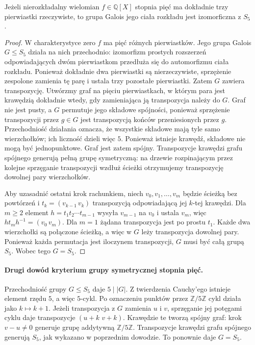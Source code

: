 \begin{lemat}
\label{aa:lem:s5-criterion}
Jeżeli nierozkładalny wielomian $f\in\mathbb Q[X]$
stopnia pięć ma dokładnie trzy pierwiastki rzeczywiste,
to grupa Galois jego ciała rozkładu jest izomorficzna z $S_5$.
\end{lemat}
\begin{proof}
W charakterystyce zero $f$ ma pięć różnych pierwiastków.
Jego grupa Galois $G\le S_5$ działa na nich przechodnio:
izomorfizm prostych rozszerzeń odpowiadających dwóm
pierwiastkom przedłuża się do automorfizmu ciała rozkładu.
Ponieważ dokładnie dwa pierwiastki są nierzeczywiste,
sprzężenie zespolone zamienia tę parę i ustala trzy
pozostałe pierwiastki. Zatem $G$ zawiera transpozycję.
Utwórzmy graf na pięciu pierwiastkach, w którym
para jest krawędzią dokładnie wtedy, gdy zamieniająca
ją transpozycja należy do $G$.
Graf nie jest pusty, a $G$ permutuje jego składowe spójności,
ponieważ sprzężenie transpozycji przez $g\in G$
jest transpozycją końców przeniesionych przez $g$.
Przechodniość działania oznacza, że wszystkie składowe
mają tyle samo wierzchołków; ich liczność dzieli więc $5$.
Ponieważ istnieje krawędź, składowe nie mogą być jednopunktowe.
Graf jest zatem spójny. Transpozycje krawędzi grafu spójnego
generują pełną grupę symetryczną: na drzewie rozpinającym
przez kolejne sprzęganie transpozycji wzdłuż ścieżki
otrzymujemy transpozycję dowolnej pary wierzchołków.

Aby uzasadnić ostatni krok rachunkiem, niech
$v_0,v_1,\ldots,v_m$ będzie ścieżką bez powtórzeń
i $t_k=(v_{k-1}\,v_k)$ transpozycją odpowiadającą jej
$k$-tej krawędzi. Dla $m\ge2$ element
$h=t_1t_2\cdots t_{m-1}$ wysyła $v_{m-1}$ na $v_0$
i ustala $v_m$, więc
$h t_m h^{-1}=(v_0\,v_m)$.
Dla $m=1$ żądana transpozycja jest po prostu $t_1$.
Każde dwa wierzchołki są połączone ścieżką,
a więc w $G$ leży transpozycja dowolnej pary.
Ponieważ każda permutacja jest iloczynem transpozycji,
$G$ musi być całą grupą $S_5$.
Wobec tego $G=S_5$.
\end{proof}

\paragraph{Drugi dowód kryterium grupy symetrycznej stopnia pięć.}
Przechodniość grupy $G\le S_5$ daje $5\mid |G|$.
Z twierdzenia Cauchy'ego istnieje element rzędu $5$,
a więc $5$-cykl. Po oznaczeniu punktów przez
$\mathbb Z/5\mathbb Z$ cykl działa jako $k\mapsto k+1$.
Jeżeli transpozycja z $G$ zamienia $u$ i $v$, sprzęganie
jej potęgami cyklu daje transpozycje $(u+k\,\,v+k)$.
Krawędzie te tworzą spójny graf: krok $v-u\ne0$
generuje grupę addytywną $\mathbb Z/5\mathbb Z$.
Transpozycje krawędzi grafu spójnego generują $S_5$,
jak wykazano w poprzednim dowodzie. To ponownie daje $G=S_5$.

